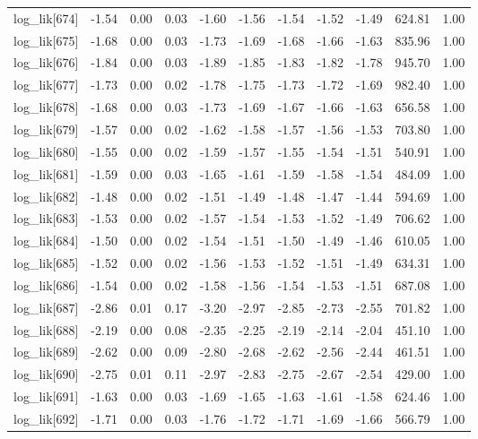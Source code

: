 \begin{table}[ht]
\begin{tabular}{rrrrrrrrrrr}
  log\_lik[674] & -1.54 & 0.00 & 0.03 & -1.60 & -1.56 & -1.54 & -1.52 & -1.49 & 624.81 & 1.00 \\ 
  log\_lik[675] & -1.68 & 0.00 & 0.03 & -1.73 & -1.69 & -1.68 & -1.66 & -1.63 & 835.96 & 1.00 \\ 
  log\_lik[676] & -1.84 & 0.00 & 0.03 & -1.89 & -1.85 & -1.83 & -1.82 & -1.78 & 945.70 & 1.00 \\ 
  log\_lik[677] & -1.73 & 0.00 & 0.02 & -1.78 & -1.75 & -1.73 & -1.72 & -1.69 & 982.40 & 1.00 \\ 
  log\_lik[678] & -1.68 & 0.00 & 0.03 & -1.73 & -1.69 & -1.67 & -1.66 & -1.63 & 656.58 & 1.00 \\ 
  log\_lik[679] & -1.57 & 0.00 & 0.02 & -1.62 & -1.58 & -1.57 & -1.56 & -1.53 & 703.80 & 1.00 \\ 
  log\_lik[680] & -1.55 & 0.00 & 0.02 & -1.59 & -1.57 & -1.55 & -1.54 & -1.51 & 540.91 & 1.00 \\ 
  log\_lik[681] & -1.59 & 0.00 & 0.03 & -1.65 & -1.61 & -1.59 & -1.58 & -1.54 & 484.09 & 1.00 \\ 
  log\_lik[682] & -1.48 & 0.00 & 0.02 & -1.51 & -1.49 & -1.48 & -1.47 & -1.44 & 594.69 & 1.00 \\ 
  log\_lik[683] & -1.53 & 0.00 & 0.02 & -1.57 & -1.54 & -1.53 & -1.52 & -1.49 & 706.62 & 1.00 \\ 
  log\_lik[684] & -1.50 & 0.00 & 0.02 & -1.54 & -1.51 & -1.50 & -1.49 & -1.46 & 610.05 & 1.00 \\ 
  log\_lik[685] & -1.52 & 0.00 & 0.02 & -1.56 & -1.53 & -1.52 & -1.51 & -1.49 & 634.31 & 1.00 \\ 
  log\_lik[686] & -1.54 & 0.00 & 0.02 & -1.58 & -1.56 & -1.54 & -1.53 & -1.51 & 687.08 & 1.00 \\ 
  log\_lik[687] & -2.86 & 0.01 & 0.17 & -3.20 & -2.97 & -2.85 & -2.73 & -2.55 & 701.82 & 1.00 \\ 
  log\_lik[688] & -2.19 & 0.00 & 0.08 & -2.35 & -2.25 & -2.19 & -2.14 & -2.04 & 451.10 & 1.00 \\ 
  log\_lik[689] & -2.62 & 0.00 & 0.09 & -2.80 & -2.68 & -2.62 & -2.56 & -2.44 & 461.51 & 1.00 \\ 
  log\_lik[690] & -2.75 & 0.01 & 0.11 & -2.97 & -2.83 & -2.75 & -2.67 & -2.54 & 429.00 & 1.00 \\ 
  log\_lik[691] & -1.63 & 0.00 & 0.03 & -1.69 & -1.65 & -1.63 & -1.61 & -1.58 & 624.46 & 1.00 \\ 
  log\_lik[692] & -1.71 & 0.00 & 0.03 & -1.76 & -1.72 & -1.71 & -1.69 & -1.66 & 566.79 & 1.00 \\ 

\end{tabular}
\end{table}

